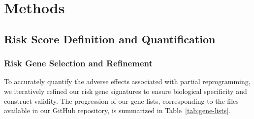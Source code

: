 \documentclass[10pt,twocolumn]{article}
\begin{document}
\raggedbottom


\section{Methods}

\subsection{Risk Score Definition and Quantification}

\subsubsection{Risk Gene Selection and Refinement}
To accurately quantify the adverse effects associated with partial reprogramming, we iteratively refined our risk gene signatures to ensure biological specificity and construct validity. The progression of our gene lists, corresponding to the files available in our GitHub repository, is summarized in Table~\ref{tab:gene-lists}.
\end{document}
